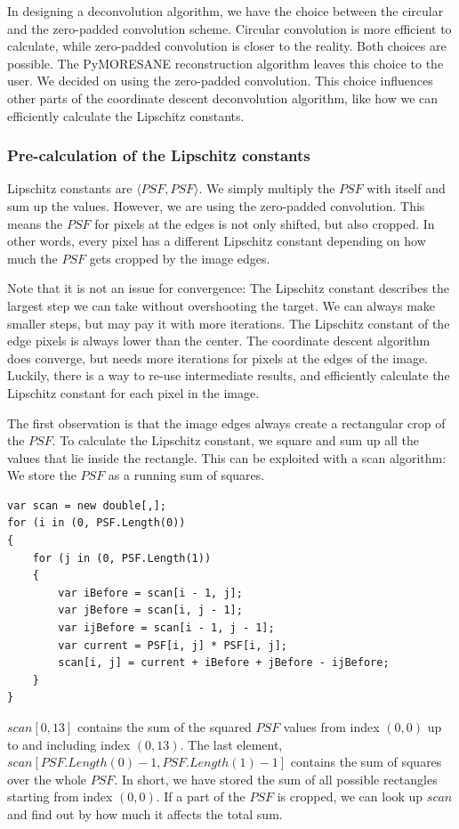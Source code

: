 In designing a deconvolution algorithm, we have the choice between the circular and the zero-padded convolution scheme. Circular convolution is more efficient to calculate, while zero-padded convolution is closer to the reality. Both choices are possible. The PyMORESANE reconstruction algorithm \cite{kenyon2019pymoresane} leaves this choice to the user. We decided on using the zero-padded convolution. This choice influences other parts of the coordinate descent deconvolution algorithm, like how we can efficiently calculate the Lipschitz constants.

\subsubsection{Pre-calculation of the Lipschitz constants}
Lipschitz constants are $\langle PSF, PSF \rangle$. We simply multiply the $PSF$ with itself and sum up the values. However, we are using the zero-padded convolution. This means the $PSF$ for pixels at the edges is not only shifted, but also cropped. In other words, every pixel has a different Lipschitz constant depending on how much the $PSF$ gets cropped by the image edges.

Note that it is not an issue for convergence: The Lipschitz constant describes the largest step we can take without overshooting the target. We can always make smaller steps, but may pay it with more iterations. The Lipschitz constant of the edge pixels is always lower than the center. The coordinate descent algorithm does converge, but needs more iterations for pixels at the edges of the image. Luckily, there is a way to re-use intermediate results, and efficiently calculate the Lipschitz constant for each pixel in the image.

The first observation is that the image edges always create a rectangular crop of the $PSF$. To calculate the Lipschitz constant, we square and sum up all the values that lie inside the rectangle. This can be exploited with a scan algorithm: We store the $PSF$ as a running sum of squares. 

\begin{lstlisting}
var scan = new double[,];
for (i in (0, PSF.Length(0))
{
	for (j in (0, PSF.Length(1))
	{
		var iBefore = scan[i - 1, j];
		var jBefore = scan[i, j - 1];
		var ijBefore = scan[i - 1, j - 1];
		var current = PSF[i, j] * PSF[i, j];
		scan[i, j] = current + iBefore + jBefore - ijBefore;
	}
}
\end{lstlisting}

$scan[0, 13]$ contains the sum of the squared $PSF$ values from index $(0,0)$ up to and including index $(0, 13)$. The last element, $scan[PSF.Length(0) - 1, PSF.Length(1) -1]$ contains the sum of squares over the whole $PSF$. In short, we have stored the sum of all possible rectangles starting from index $(0,0)$. If a part of the $PSF$ is cropped, we can look up $scan$ and find out by how much it affects the total sum.

